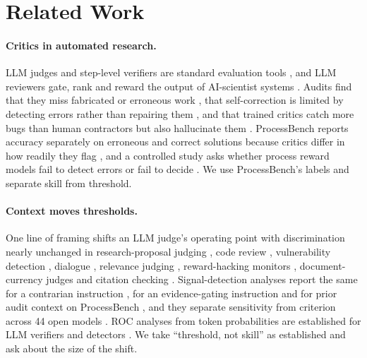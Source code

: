 \documentclass[letterpaper]{article} %
\begin{document}
\section{Related Work}
\label{sec:related}

\paragraph{Critics in automated research.} LLM judges and step-level verifiers are standard evaluation tools \citep{zheng2023judging,lightman2024verify}, and LLM reviewers gate, rank and reward the output of AI-scientist systems \citep{lu2024aiscientist,yamada2025aiscientistv2,weng2025cycleresearcher,biswas2026aaai}. Audits find that they miss fabricated or erroneous work \citep{jiang2026badscientist,son2025spot}, that self-correction is limited by detecting errors rather than repairing them \citep{huang2024cannot,tyen2024llms}, and that trained critics catch more bugs than human contractors but also hallucinate them \citep{mcaleese2024critics}. ProcessBench reports accuracy separately on erroneous and correct solutions because critics differ in how readily they flag \citep{zheng2025processbench}, and a controlled study asks whether process reward models fail to detect errors or fail to decide \citep{anon2026prm}. We use ProcessBench's labels and separate skill from threshold.

\paragraph{Context moves thresholds.} One line of framing shifts an LLM judge's operating point with discrimination nearly unchanged in research-proposal judging \citep{ho2026soundnessbench}, code review \citep{alexopoulos2026agrees}, vulnerability detection \citep{shahriar2026words}, dialogue \citep{rabbani2026dialdefer}, relevance judging \citep{zhang2026polite}, reward-hacking monitors \citep{kezendirane2026hacking}, document-currency judges \citep{shah2026verify} and citation checking \citep{abtahi2026sanad}. Signal-detection analyses report the same for a contrarian instruction \citep{quiroz2026criterion}, for an evidence-gating instruction \citep{basta2026correction} and for prior audit context on ProcessBench \citep{mazaheri2026prior}, and they separate sensitivity from criterion across 44 open models \citep{dong2026sensitivity}. ROC analyses from token probabilities are established for LLM verifiers and detectors \citep{anon2026zebra,cacioli2026signal,chegini2025razor}. We take ``threshold, not skill'' as established and ask about the size of the shift.
\end{document}
